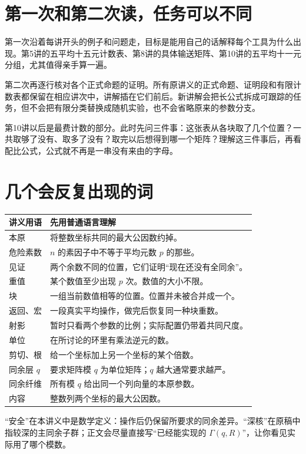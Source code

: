\documentclass[11pt,a4paper,oneside,openany]{book}
\theoremstyle{definition}
\numberwithin{equation}{chapter}
\begin{document}
\section*{第一次和第二次读，任务可以不同}
第一次沿着每讲开头的例子和问题走，目标是能用自己的话解释每个工具为什么出现。第5讲的五平均十五元计数表、第8讲的具体输送矩阵、第10讲的五平均十一元分组，尤其值得亲手算一遍。

第二次再逐行核对各个正式命题的证明。所有原讲义的正式命题、证明段和有限计数表都保留在相应讲次中，讲解插在它们前后。新讲解会把长公式拆成可跟踪的任务，但不会把有限分类替换成随机实验，也不会省略原来的参数分支。

第10讲以后是最费计数的部分。此时先问三件事：这张表从各块取了几个位置？一共取够了没有、取多了没有？取完以后想得到哪一个矩阵？理解这三件事后，再看配比公式，公式就不再是一串没有来由的字母。

\section*{几个会反复出现的词}
\begin{longtable}{p{}p{}}
\toprule 讲义用语 & 先用普通语言理解\\\midrule
本原 & 将整数坐标共同的最大公因数约掉。\\
危险素数 & $n$ 的素因子中不等于平均元数 $p$ 的那些。\\
见证 & 两个余数不同的位置，它们证明“现在还没有全同余”。\\
重值 & 某个数值至少出现 $p$ 次。数值的大小不限。\\
块 & 一组当前数值相等的位置。位置并未被合并成一个。\\
返回、宏 & 一段真实平均操作，做完后恢复同一种块重数。\\
射影 & 暂时只看两个参数的比例；实际配置仍带着共同尺度。\\
单位 & 在所讨论的环里有乘法逆元的数。\\
剪切、根 & 给一个坐标加上另一个坐标的某个倍数。\\
同余层 $q$ & 要求矩阵模 $q$ 为单位矩阵；$q$ 越大通常要求越严。\\
同余纤维 & 所有模 $q$ 给出同一个列向量的本原参数。\\
内容 & 整数列两个坐标的最大公因数。\\\bottomrule
\end{longtable}
“安全”在本讲义中是数学定义：操作后仍保留所要求的同余差异。“深核”在原稿中指较深的主同余子群；正文会尽量直接写“已经能实现的 $\Gamma(q,R)$”，让你看见实际用了哪个模数。
\end{document}
